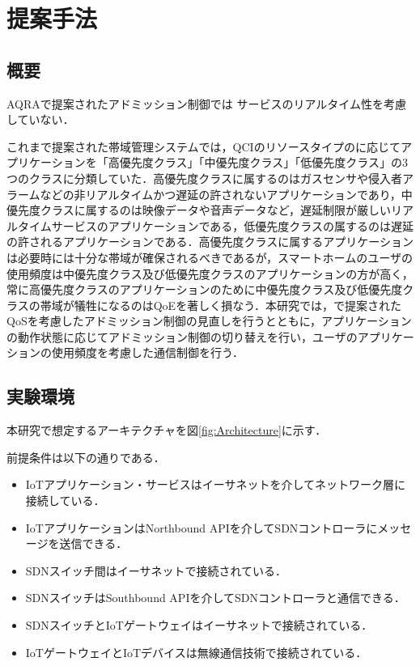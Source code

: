\documentclass[a4paper,10pt,twocolumn,uplatex]{jsarticle}
\begin{document}
\section{提案手法}

\subsection{概要}
AQRAで提案されたアドミッション制御では
サービスのリアルタイム性を考慮していない．

これまで提案された帯域管理システムでは，QCIのリソースタイプのに応じてアプリケーションを「高優先度クラス」「中優先度クラス」「低優先度クラス」の3つのクラスに分類していた．高優先度クラスに属するのはガスセンサや侵入者アラームなどの非リアルタイムかつ遅延の許されないアプリケーションであり，中優先度クラスに属するのは映像データや音声データなど，遅延制限が厳しいリアルタイムサービスのアプリケーションである，低優先度クラスの属するのは遅延の許されるアプリケーションである．高優先度クラスに属するアプリケーションは必要時には十分な帯域が確保されるべきであるが，スマートホームのユーザの使用頻度は中優先度クラス及び低優先度クラスのアプリケーションの方が高く，常に高優先度クラスのアプリケーションのために中優先度クラス及び低優先度クラスの帯域が犠牲になるのはQoEを著しく損なう．本研究では，\cite{AQRA}で提案されたQoSを考慮したアドミッション制御の見直しを行うとともに，アプリケーションの動作状態に応じてアドミッション制御の切り替えを行い，ユーザのアプリケーションの使用頻度を考慮した通信制御を行う．

\subsection{実験環境}
本研究で想定するアーキテクチャを図\ref{fig:Architecture}に示す．\par
前提条件は以下の通りである．\par

\begin{itemize}
  \item IoTアプリケーション・サービスはイーサネットを介してネットワーク層に接続している．
  \item IoTアプリケーションはNorthbound APIを介してSDNコントローラにメッセージを送信できる．
  \item SDNスイッチ間はイーサネットで接続されている．
  \item SDNスイッチはSouthbound APIを介してSDNコントローラと通信できる．
  \item SDNスイッチとIoTゲートウェイはイーサネットで接続されている．
  \item IoTゲートウェイとIoTデバイスは無線通信技術で接続されている．
\end{itemize}
\end{document}
